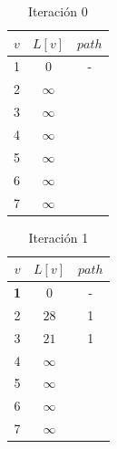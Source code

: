 \documentclass[letterpaper,10pt]{article}
\begin{document}
\begin{enumerate}
         \begin{minipage}[t]{0.3\textwidth}
            \begin{table}[H]
                \centering
            \begin{tabular}{|c|c|c|}\hline
                $ v  $ & $L[v]$ & $path$  \\ \hline
                 1 & $0$ & -      \\\hline
                 2 & $\infty$ &    \\\hline
                 3 & $\infty$ &    \\\hline
                 4 & $\infty$ &    \\\hline
                 5 & $\infty$ &    \\\hline
                 6 & $\infty$ &    \\\hline
                 7 & $\infty$ &    \\\hline
                \end{tabular}
                \caption{Iteración 0}
                \label{tablitaiteracion0}
            \end{table}
        \end{minipage}
        \begin{minipage}[t]{0.3\textwidth}
            \begin{table}[H]
                \centering
            \begin{tabular}{|c|c|c|}\hline
                $ v  $ & $L[v]$ & $path$  \\ \hline
                \textbf{1} & $0$ & -      \\\hline
                 2 & $28$ & 1   \\\hline
                 3 & $21$ & 1  \\\hline
                 4 & $\infty$ &    \\\hline
                 5 & $\infty$ &    \\\hline
                 6 & $\infty$ &    \\\hline
                 7 & $\infty$ &    \\\hline
                \end{tabular}
                \caption{Iteración 1}
                \label{tablitaiteracion1}
            \end{table}
        \end{minipage}
        \begin{minipage}[t]{0.3\textwidth}
            \begin{table}[H]
                \centering

\end{table}
\end{minipage}
\end{enumerate}
\end{document}
